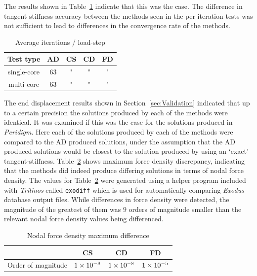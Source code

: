 \documentclass[preprint,12pt]{elsarticle}
\begin{document}
The results shown in Table~\ref{tab:ConvergenceStudy2} indicate that this was the case.  The difference in tangent-stiffness accuracy between the methods seen in the per-iteration tests was not sufficient to lead to differences in the convergence rate of the methods.
%
\begin{table}[htb]   
    \centering 
    \caption{Average iterations / load-step} 
    \label{tab:ConvergenceStudy2}   
    \begin{tabular}{c c c c c}
        \toprule 
        Test type & AD & CS & CD & FD\\
        \midrule 
        single-core & 63 & " & " & "\\ 
        multi-core  & 63 & " & " & "\\ 
        \bottomrule 
    \end{tabular} 
\end{table}

The end displacement results shown in Section~\ref{sec:Validation} indicated that up to a certain precision the solutions produced by each of the methods were identical. It was examined if this was the case for the solutions produced in \emph{Peridigm}. Here each of the solutions produced by each of the methods were compared to the AD produced solutions, under the assumption that the AD produced solutions would be closest to the solution produced by using an `exact' tangent-stiffness. Table~\ref{tab:PeridigmSolutionAccuracy} shows maximum force density discrepancy, indicating that the methods did indeed produce differing solutions in terms of nodal force density. The values for Table~\ref{tab:PeridigmSolutionAccuracy} were generated using a helper program included with \emph{Trilinos} called {\tt exodiff} which is used for automatically comparing \emph{Exodus} database output files. While differences in force density were detected, the magnitude of the greatest of them was $9$ orders of magnitude smaller than the relevant nodal force density values being differenced. 
%
\begin{table}[hbp]   
    \centering 
    \caption{Nodal force density maximum difference} 
    \label{tab:PeridigmSolutionAccuracy}   
    \begin{tabular}{c c c c}
        \toprule  & CS & CD & FD\\
        \midrule  Order of magnitude & $\num{1.E-8}$ & $\num{1.E-8}$ & $\num{1.E-5}$ \\ 
        \bottomrule 
    \end{tabular} 
\end{table}
\end{document}
